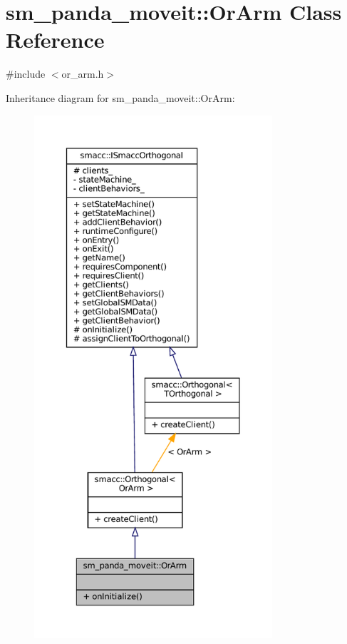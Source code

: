 \hypertarget{classsm__panda__moveit_1_1OrArm}{}\section{sm\+\_\+panda\+\_\+moveit\+:\+:Or\+Arm Class Reference}
\label{classsm__panda__moveit_1_1OrArm}


{\ttfamily \#include $<$or\+\_\+arm.\+h$>$}



Inheritance diagram for sm\+\_\+panda\+\_\+moveit\+:\+:Or\+Arm\+:
\nopagebreak
\begin{figure}[H]
\begin{center}
\leavevmode
\includegraphics[height=550pt]{classsm__panda__moveit_1_1OrArm__inherit__graph}
\end{center}
\end{figure}



